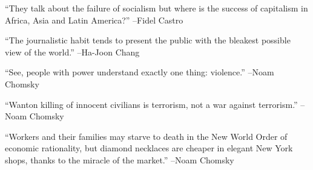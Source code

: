 \documentclass{article}%
\begin{document}
\linebreak%
\vspace{1mm}%
\begin{minipage}{\textwidth}%
\flushleft%
“They talk about the failure of socialism but where is the success of capitalism in Africa, Asia and Latin America?”%
\linebreak%
\vspace{1mm}%
–Fidel Castro%
\linebreak%
\vspace{1mm}%
\end{minipage}%
\linebreak%
\vspace{1mm}%
\begin{minipage}{\textwidth}%
\flushleft%
“The journalistic habit tends to present the public with the bleakest possible view of the world.”%
\linebreak%
\vspace{1mm}%
–Ha{-}Joon Chang%
\linebreak%
\vspace{1mm}%
\end{minipage}%
\linebreak%
\vspace{1mm}%
\begin{minipage}{\textwidth}%
\flushleft%
“See, people with power understand exactly one thing: violence.”%
\linebreak%
\vspace{1mm}%
–Noam Chomsky%
\linebreak%
\vspace{1mm}%
\end{minipage}%
\linebreak%
\vspace{1mm}%
\begin{minipage}{\textwidth}%
\flushleft%
“Wanton killing of innocent civilians is terrorism, not a war against terrorism.”%
\linebreak%
\vspace{1mm}%
–Noam Chomsky%
\linebreak%
\vspace{1mm}%
\end{minipage}%
\linebreak%
\vspace{1mm}%
\begin{minipage}{\textwidth}%
\flushleft%
“Workers and their families may starve to death in the New World Order of economic rationality, but diamond necklaces are cheaper in elegant New York shops, thanks to the miracle of the market.”%
\linebreak%
\vspace{1mm}%
–Noam Chomsky%
\linebreak%
\vspace{1mm}%
\end{minipage}%
\end{document}
